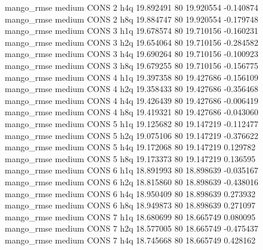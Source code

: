        mango_rmse     medium     CONS                 2                  h4q 19.892491 80      19.920554          -0.140874
       mango_rmse     medium     CONS                 2                  h8q 19.884747 80      19.920554          -0.179748
       mango_rmse     medium     CONS                 3                  h1q 19.678574 80      19.710156          -0.160231
       mango_rmse     medium     CONS                 3                  h2q 19.654064 80      19.710156          -0.284582
       mango_rmse     medium     CONS                 3                  h4q 19.690264 80      19.710156          -0.100923
       mango_rmse     medium     CONS                 3                  h8q 19.679255 80      19.710156          -0.156775
       mango_rmse     medium     CONS                 4                  h1q 19.397358 80      19.427686          -0.156109
       mango_rmse     medium     CONS                 4                  h2q 19.358433 80      19.427686          -0.356468
       mango_rmse     medium     CONS                 4                  h4q 19.426439 80      19.427686          -0.006419
       mango_rmse     medium     CONS                 4                  h8q 19.419321 80      19.427686          -0.043060
       mango_rmse     medium     CONS                 5                  h1q 19.125682 80      19.147219          -0.112477
       mango_rmse     medium     CONS                 5                  h2q 19.075106 80      19.147219          -0.376622
       mango_rmse     medium     CONS                 5                  h4q 19.172068 80      19.147219           0.129782
       mango_rmse     medium     CONS                 5                  h8q 19.173373 80      19.147219           0.136595
       mango_rmse     medium     CONS                 6                  h1q 18.891993 80      18.898639          -0.035167
       mango_rmse     medium     CONS                 6                  h2q 18.815860 80      18.898639          -0.438016
       mango_rmse     medium     CONS                 6                  h4q 18.950409 80      18.898639           0.273932
       mango_rmse     medium     CONS                 6                  h8q 18.949873 80      18.898639           0.271097
       mango_rmse     medium     CONS                 7                  h1q 18.680699 80      18.665749           0.080095
       mango_rmse     medium     CONS                 7                  h2q 18.577005 80      18.665749          -0.475437
       mango_rmse     medium     CONS                 7                  h4q 18.745668 80      18.665749           0.428162

